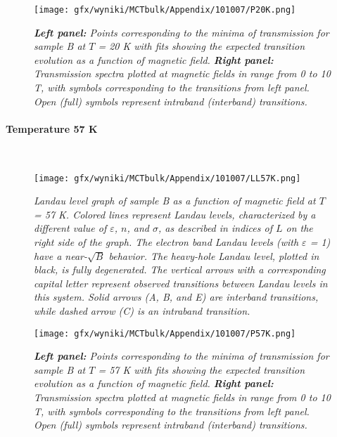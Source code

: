 \documentclass[titlepage,a4paper]{book}
\newcommand{\myparagraph}[1]{\paragraph{#1}\mbox{}\\}
\begin{document}
\begin{figure}[H]
	\centering
	\texttt{[image: gfx/wyniki/MCTbulk/Appendix/101007/P20K.png]}
	\vspace{-10pt}
	\caption{\textit{\textbf{Left panel:} Points corresponding to the minima of transmission for sample B at $T$ = 20 K with fits showing the expected transition evolution as a function of magnetic field. \textbf{Right panel:} Transmission spectra plotted at magnetic fields in range from 0 to 10 T, with symbols corresponding to the transitions from left panel. Open (full) symbols represent intraband (interband) transitions.}}
	\label{fig:Spectra_101007_20K}
\end{figure}  

\myparagraph{Temperature 57 K}
\begin{figure}[H]
	\centering
	\texttt{[image: gfx/wyniki/MCTbulk/Appendix/101007/LL57K.png]}
	\vspace{-10pt}
	\caption{\textit{Landau level graph of sample B as a function of magnetic field at $T$ = 57 K. Colored lines represent Landau levels, characterized by a different value of $\varepsilon$, $n$, and $\sigma$, as described in indices of $L$ on the right side of the graph. The electron band Landau levels (with $\varepsilon$ = 1) have a near-$\sqrt{B}$ behavior. The heavy-hole Landau level, plotted in black, is fully degenerated. The vertical arrows with a corresponding capital letter represent observed transitions between Landau levels in this system. Solid arrows (A, B, and E) are interband transitions, while dashed arrow (C) is an intraband transition.}}
	\label{fig:LL_101007_57K}
\end{figure}

\begin{figure}[H]
	\centering
	\texttt{[image: gfx/wyniki/MCTbulk/Appendix/101007/P57K.png]}
	\vspace{-10pt}
	\caption{\textit{\textbf{Left panel:} Points corresponding to the minima of transmission for sample B at $T$ = 57 K with fits showing the expected transition evolution as a function of magnetic field. \textbf{Right panel:} Transmission spectra plotted at magnetic fields in range from 0 to 10 T, with symbols corresponding to the transitions from left panel. Open (full) symbols represent intraband (interband) transitions.}}
	\label{fig:Spectra_101007_57K}
\end{figure}  
\end{document}
